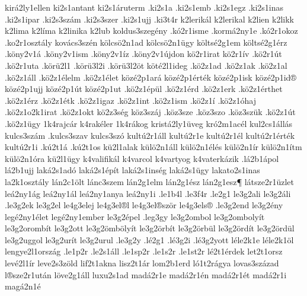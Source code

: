 {%
kir^^e12ly1ellen
ki2s1antant
ki2s1^^e1ruterm
.ki2s1a
.ki2s1emb
.ki2s1egz
.ki2s1inas
.ki2s1ipar
.ki2s3sz^^e1m
.ki2s3szer
.ki2s1ujj
.ki3t4r
k2lerik^^e1l
k2lerikal
k2lien
k2likk
k2lima
k2l^^edma
k2linika
k2lub
koldus3szeg^^e9ny
.k^^f32r1isme
.korm^^e12ny1e
.k^^f32r1okoz
.ko2r1oszt^^e1ly
kov^^e1cs3sz^^e9n
k^^f6lcs^^f62n1ad
k^^f6lcs^^f62n1^^fcgy
k^^f6lts^^e92g1em
k^^f6lts^^e92g1^^e9rz %
.k^^f6ny2v1^^e1
.k^^f6ny2v1ism
.k^^f6ny2v1^^edz
.k^^f6ny2v1^^fajdon
k^^f62r1irat
k^^f62r1^^edv
.k^^f62r1^^fat
.k^^f62r1uta
.k^^f6r^^fc2l1
.k^^f6r^^fc3l2i
.k^^f6r^^fc3l2^^f6t
k^^f6t^^e92l1ideg
.k^^f62z1ad
.k^^f62z1ak
.k^^f62z1al
.k^^f62z1^^e1ll
.k^^f62z1^^e9lelm
.k^^f62z1^^e9let
k^^f6z^^e92p1ar^^e1
k^^f6z^^e92p1^^e9rt^^e9k
k^^f6z^^e92p1isk
k^^f6z^^e92p1id^^ae
k^^f6z^^e92p1ujj
k^^f6z^^e92p1^^fat
k^^f6z^^e92p1ut
.k^^f62z1^^e9p^^fcl
.k^^f62z1^^e9rd
.k^^f62z1erk
.k^^f62z1^^e9rthet
.k^^f62z1^^e9rz
.k^^f62z1^^e9tk
.k^^f62z1igaz
.k^^f62z1int
.k^^f62z1ism
.k^^f62z1^^ed
.k^^f62z1^^f3haj
.k^^f62z1o2k1irat
.k^^f62z1okt
k^^f62z3s^^e9g
k^^f6z3sz^^e1j
.k^^f6z3sze
.k^^f6z3szo
.k^^f6z3sz^^fck
.k^^f62z1^^fat
.k^^f62z1^^fcgy
1k4rajc^^e1r
k4rak^^e9ler
1k4r^^e1kog
krist^^e12ly1^^fcveg
kr^^f32m1ac^^e9l
kul2cs1^^e1ll^^e1s
kulcs3sz^^e1m
.kulcs3szav
kulcs3sz^^f3
kult^^fa2r1^^e1ll
kult^^fa2r1e
kult^^fa2r1^^e9l
kult^^fa2r1^^e9rt^^e9k
kult^^fa2r1i
.k^^fa2t1^^e1
.k^^fa2t1os
k^^fc2l1alak
k^^fcl^^f62n1^^e1ll
k^^fcl^^f62n1^^e9l^^e9s
k^^fcl^^f62n1^^edr
k^^fcl^^f62n1^^edtm
k^^fcl^^f62n1^^f3ra
k^^fc2l1^^fcgy
k4valifik^^e1l
k4varcol
k4vartyog
k4vaterk^^e1zik
.l^^e12b1^^e1pol
l^^e12b1ujj
lak^^e12s1ad^^f3
lak^^e12s1^^e9p^^edt
lak^^e12s1ins^^e9g
lak^^e12s1^^fcgy
lakato2s1inas
la2k1oszt^^e1ly
l^^e1n2c1^^f6lt
l^^e1nc3szem
l^^e1n2g1elm
l^^e1n2g1^^e9sz
l^^e1n2g1esz^^b6
l^^e1tsze2r1^^fczlet
le^^e12ny1^^e1g
le^^e12ny1^^e1l
le^^e12ny1anya
le^^e12ny1i
.le1b4l
.le3f4r
.le2g1
le3g2ali
le3g2^^e1li
.le3g2ek
le3g2el
le4g3elej
le4g3el^^ael
le4g3el^^aesz^^f6r
le4g3els^^ae
.le3g2end
le3g2^^e9ny
leg^^e92ny1^^e9let
leg^^e92ny1ember
le3g2^^e9pel
.leg3gy
le3g2ombol
le3g2omboly^^edt
le3g2oromb^^edt
le3g2ott
le3g2^^f6mb^^f6ly^^edt
le3g2^^f6rb^^edt
le3g2^^f6rb^^fcl
le3g2^^f6rd^^edt
le3g2^^f6rd^^fcl
le3g2uggol
le3g2ur^^edt
le3g2urul
.le3g2y
.l^^e92g1
.l^^e93g2i
.l^^e93g2yott
l^^e9le2k1e
l^^e9le2k1^^f6l
lengye2l1orsz^^e1g
.le1p2r
.le2s1^^e1ll
.le1sp2r
.le1s2r
.le1st2r
l^^e92t1^^e9rdek
let2t1orsz
lev^^e92l1^^edr
leve2s3z^^f6ld
lif2t1akna
lisz2t1^^e1r
lom2b1erd
l^^f31t2r^^e1gya
lovas3sz^^e1zad
l^^aesze2r1ut^^e1n
l^^f6ve2g1^^e1ll
luxu2s1ad
mad^^e12r1e
mad^^e12r1^^e9n
mad^^e12r1^^e9t
mad^^e12r1i
mag^^e12n1^^e9    %
}

